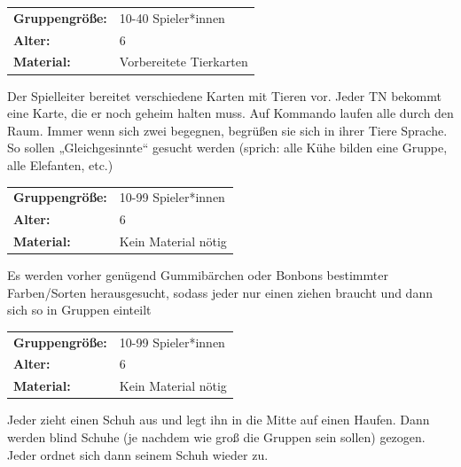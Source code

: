 \begin{table}[h]
\begin{tabular}{>{\bfseries}lp{8cm}}
   Gruppengröße:   & 10-40 Spieler*innen\\
    Alter: & 6 \\
    Material: &  
        Vorbereitete Tierkarten\\
\end{tabular}
\end{table} 

        Der Spielleiter bereitet verschiedene Karten mit Tieren vor. Jeder TN bekommt eine Karte, die er noch geheim halten muss. Auf Kommando laufen alle durch den Raum. Immer wenn sich zwei begegnen, begrüßen sie sich in ihrer Tiere Sprache. So sollen „Gleichgesinnte“ gesucht werden (sprich: alle Kühe bilden eine Gruppe, alle Elefanten, etc.)
    \\




\begin{table}[H]
\begin{tabular}{>{\bfseries}lp{8cm}}
    Gruppengröße: & 10-99 Spieler*innen\\
    Alter: & 6 \\
    Material: &  Kein Material nötig\\
\end{tabular}
\end{table} 
Es werden vorher genügend Gummibärchen oder Bonbons bestimmter Farben/Sorten herausgesucht, sodass jeder nur einen ziehen braucht und dann sich so in Gruppen einteilt
    \\






\begin{table}[H]
\begin{tabular}{>{\bfseries}lp{8cm}}
   Gruppengröße:   & 10-99 Spieler*innen\\
    Alter: & 6 \\
    Material: &  Kein Material nötig\\
\end{tabular}
\end{table} 
        Jeder zieht einen Schuh aus und legt ihn in die Mitte auf einen Haufen. Dann werden blind Schuhe (je nachdem wie groß die Gruppen sein sollen) gezogen. Jeder ordnet sich dann seinem Schuh wieder zu.\\



